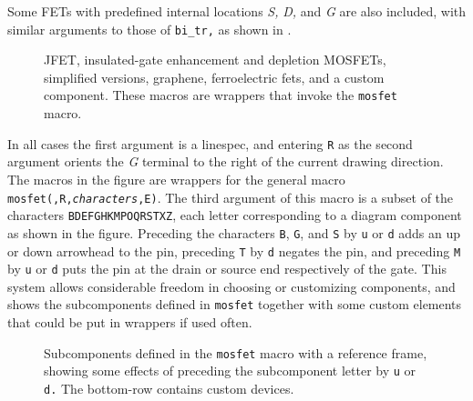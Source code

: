 Some FETs with predefined internal locations {\sl S,} {\sl D,} and {\sl G} are
also included, with similar arguments to those of {\tt bi\_tr,} as shown in
.
\begin{figure}[H]
\vspace*{-\baselineskip}
   
   \caption{JFET, insulated-gate enhancement and depletion MOSFETs,
     simplified versions, graphene, ferroelectric fets, and a custom component. 
     These macros are wrappers that invoke the {\tt mosfet}
     macro.}
   \label{fetwrap}
   \end{figure}
In all cases the first argument is a linespec,
and entering
{\tt R} as the second argument orients the {\sl G} terminal to the right of the
current drawing direction.
The macros in the figure are wrappers for the
general macro {\tt mosfet(\linespec,R,{\sl characters},E)}.
The third argument of this macro is a subset of the characters
{\tt BDEFGHKMPOQRSTXZ}, each letter corresponding to
a diagram component as shown in the figure. 
Preceding the characters {\tt B}, {\tt G}, and {\tt S} by {\tt u} or {\tt d}
adds an up or down arrowhead to the pin, preceding {\tt T} by {\tt d}
negates the pin, and preceding {\tt M} by {\tt u} or {\tt d} puts the pin
at the drain or source end respectively of the gate.
This system allows considerable freedom in choosing or customizing components,
and  shows the subcomponents defined in {\tt mosfet}
together with some custom elements that could be put in wrappers
if used often.
\begin{figure}[H]
   
   \caption{Subcomponents defined in the {\tt mosfet} macro with a reference
     frame, showing some
     effects of preceding the subcomponent letter by {\tt u} or {\tt d.}
     The bottom-row contains custom devices.}
   \label{fetcomp}
   \end{figure}

